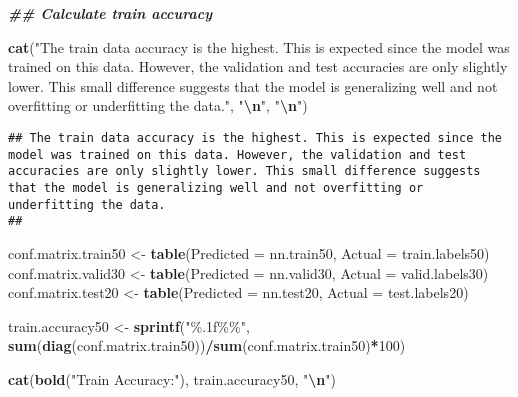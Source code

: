 \documentclass[
]{article}
\newenvironment{Shaded}{\begin{snugshade}}{\end{snugshade}}
\newcommand{\AttributeTok}[1]{\textcolor[rgb]{0.13,0.29,0.53}{#1}}
\newcommand{\DecValTok}[1]{\textcolor[rgb]{0.00,0.00,0.81}{#1}}
\newcommand{\DocumentationTok}[1]{\textcolor[rgb]{0.56,0.35,0.01}{\textbf{\textit{#1}}}}
\newcommand{\FunctionTok}[1]{\textcolor[rgb]{0.13,0.29,0.53}{\textbf{#1}}}
\newcommand{\NormalTok}[1]{#1}
\newcommand{\OtherTok}[1]{\textcolor[rgb]{0.56,0.35,0.01}{#1}}
\newcommand{\SpecialCharTok}[1]{\textcolor[rgb]{0.81,0.36,0.00}{\textbf{#1}}}
\newcommand{\StringTok}[1]{\textcolor[rgb]{0.31,0.60,0.02}{#1}}
\begin{document}
\begin{Shaded}
\begin{Highlighting}[]
\DocumentationTok{\#\# Calculate train accuracy}

\FunctionTok{cat}\NormalTok{(}\StringTok{"The train data accuracy is the highest. This is expected since the model was trained on this data. However, the validation and test accuracies are only slightly lower. This small difference suggests that the model is generalizing well and not overfitting or underfitting the data."}\NormalTok{, }\StringTok{"}\SpecialCharTok{\textbackslash{}n}\StringTok{"}\NormalTok{, }\StringTok{"}\SpecialCharTok{\textbackslash{}n}\StringTok{"}\NormalTok{)}
\end{Highlighting}
\end{Shaded}

\begin{verbatim}
## The train data accuracy is the highest. This is expected since the model was trained on this data. However, the validation and test accuracies are only slightly lower. This small difference suggests that the model is generalizing well and not overfitting or underfitting the data. 
## 
\end{verbatim}

\begin{Shaded}
\begin{Highlighting}[]
\NormalTok{conf.matrix.train50 }\OtherTok{\textless{}{-}} \FunctionTok{table}\NormalTok{(}\AttributeTok{Predicted =}\NormalTok{ nn.train50, }\AttributeTok{Actual =}\NormalTok{ train.labels50)}
\NormalTok{conf.matrix.valid30 }\OtherTok{\textless{}{-}} \FunctionTok{table}\NormalTok{(}\AttributeTok{Predicted =}\NormalTok{ nn.valid30, }\AttributeTok{Actual =}\NormalTok{ valid.labels30)}
\NormalTok{conf.matrix.test20 }\OtherTok{\textless{}{-}} \FunctionTok{table}\NormalTok{(}\AttributeTok{Predicted =}\NormalTok{ nn.test20, }\AttributeTok{Actual =}\NormalTok{ test.labels20)}

\NormalTok{train.accuracy50 }\OtherTok{\textless{}{-}} \FunctionTok{sprintf}\NormalTok{(}\StringTok{"\%.1f\%\%"}\NormalTok{, }\FunctionTok{sum}\NormalTok{(}\FunctionTok{diag}\NormalTok{(conf.matrix.train50))}\SpecialCharTok{/}\FunctionTok{sum}\NormalTok{(conf.matrix.train50)}\SpecialCharTok{*}\DecValTok{100}\NormalTok{)}

\FunctionTok{cat}\NormalTok{(}\FunctionTok{bold}\NormalTok{(}\StringTok{"Train Accuracy:"}\NormalTok{), train.accuracy50, }\StringTok{"}\SpecialCharTok{\textbackslash{}n}\StringTok{"}\NormalTok{)}
\end{Highlighting}
\end{Shaded}
\end{document}
